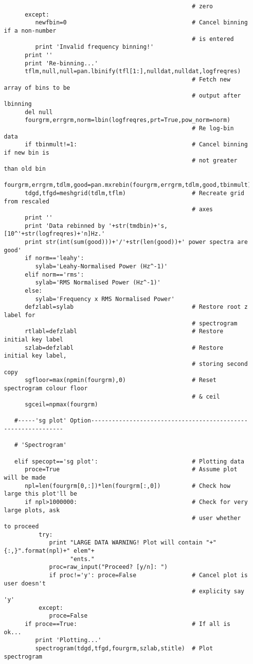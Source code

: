\begin{verbatim}
                                                      # zero             
      except:
         newfbin=0                                    # Cancel binning if a non-number
                                                      # is entered
         print 'Invalid frequency binning!'
      print ''
      print 'Re-binning...'
      tflm,null,null=pan.lbinify(tfl[1:],nulldat,nulldat,logfreqres)
                                                      # Fetch new array of bins to be
                                                      # output after lbinning
      del null
      fourgrm,errgrm,norm=lbin(logfreqres,prt=True,pow_norm=norm)
                                                      # Re log-bin data
      if tbinmult!=1:                                 # Cancel binning if new bin is
                                                      # not greater than old bin
         fourgrm,errgrm,tdlm,good=pan.mxrebin(fourgrm,errgrm,tdlm,good,tbinmult)
      tdgd,tfgd=meshgrid(tdlm,tflm)                   # Recreate grid from rescaled
                                                      # axes
      print ''
      print 'Data rebinned by '+str(tmdbin)+'s, [10^'+str(logfreqres)+'n]Hz.'
      print str(int(sum(good)))+'/'+str(len(good))+' power spectra are good'
      if norm=='leahy':
         sylab='Leahy-Normalised Power (Hz^-1)'
      elif norm=='rms':
         sylab='RMS Normalised Power (Hz^-1)'
      else:
         sylab='Frequency x RMS Normalised Power'
      defzlabl=sylab                                  # Restore root z label for
                                                      # spectrogram              
      rtlabl=defzlabl                                 # Restore initial key label
      szlab=defzlabl                                  # Restore initial key label,
                                                      # storing second copy
      sgfloor=max(npmin(fourgrm),0)                   # Reset spectrogram colour floor
                                                      # & ceil
      sgceil=npmax(fourgrm)

   #-----'sg plot' Option--------------------------------------------------------------

   # 'Spectrogram'

   elif specopt=='sg plot':                           # Plotting data
      proce=True                                      # Assume plot will be made
      npl=len(fourgrm[0,:])*len(fourgrm[:,0])         # Check how large this plot'll be
      if npl>1000000:                                 # Check for very large plots, ask
                                                      # user whether to proceed
          try:
             print "LARGE DATA WARNING! Plot will contain "+"{:,}".format(npl)+" elem"+
                   "ents."
             proc=raw_input("Proceed? [y/n]: ")
             if proc!='y': proce=False                # Cancel plot is user doesn't
                                                      # explicity say 'y'
          except:
             proce=False
      if proce==True:                                 # If all is ok...
         print 'Plotting...'
         spectrogram(tdgd,tfgd,fourgrm,szlab,stitle)  # Plot spectrogram 


\end{verbatim}
